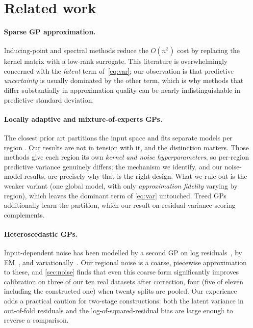 \documentclass[11pt]{article}
\begin{document}
\section{Related work}
\label{sec:related}

\paragraph{Sparse GP approximation.} Inducing-point and spectral methods
\citep{quinonero2005, titsias2009, rahimi2007, williams2001, smola2000} reduce the
$O(n^3)$ cost by replacing the kernel matrix with a low-rank surrogate. This
literature is overwhelmingly concerned with the \emph{latent} term of~\cref{eq:var};
our observation is that predictive \emph{uncertainty} is usually dominated by the
other term, which is why methods that differ substantially in approximation quality
can be nearly indistinguishable in predictive standard deviation.

\paragraph{Locally adaptive and mixture-of-experts GPs.} The closest prior art
partitions the input space and fits separate models per region
\citep{rasmussen2002, tresp2000, deisenroth2015, gramacy2008}. Our results are not in
tension with it, and the distinction matters. Those methods give each region its own
\emph{kernel and noise hyperparameters}, so per-region predictive variance genuinely
differs; the mechanism we identify, and our noise-model results, are precisely why
that is the right design. What we rule out is the weaker variant (one global model,
with only \emph{approximation fidelity} varying by region), which leaves the dominant
term of \cref{eq:var} untouched. Treed GPs~\citep{gramacy2008} additionally learn the
partition, which our result on residual-variance scoring complements.

\paragraph{Heteroscedastic GPs.} Input-dependent noise has been modelled by a second
GP on log residuals~\citep{goldberg1997}, by EM~\citep{kersting2007}, and
variationally~\citep{lazarogredilla2011}. Our regional noise is a coarse, piecewise
approximation to these, and \cref{sec:noise} finds that even this coarse form
significantly improves calibration on three of our ten real datasets after
correction, four (five of eleven including the constructed one) when twenty splits are
pooled. Our experience adds a practical caution for
two-stage constructions: both the latent variance in out-of-fold residuals and the
log-of-squared-residual bias are large enough to reverse a comparison.
\end{document}
